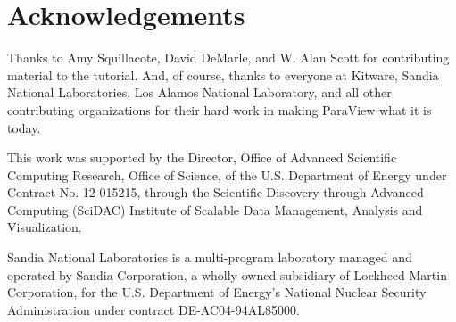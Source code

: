 \documentclass[@GLOBAL_OPTIONS@]{book}
\begin{document}

\tableofcontents

\listofexercise

\mainmatter











\backmatter

\chapter{Acknowledgements}

Thanks to Amy Squillacote, David DeMarle, and W. Alan Scott for
contributing material to the tutorial.  And, of course, thanks to everyone
at Kitware, Sandia National Laboratories, Los Alamos National Laboratory,
and all other contributing organizations for their hard work in making
ParaView what it is today.

This work was supported by the Director, Office of Advanced Scientific
Computing Research, Office of Science, of the U.S. Department of Energy
under Contract No. 12-015215, through the Scientific Discovery through
Advanced Computing (SciDAC) Institute of Scalable Data Management,
Analysis and Visualization.

Sandia National Laboratories is a multi-program laboratory managed and
operated by Sandia Corporation, a wholly owned subsidiary of Lockheed
Martin Corporation, for the U.S. Department of Energy's National Nuclear
Security Administration under contract DE-AC04-94AL85000.

\clearpage
{}
{}
\printindex
\end{document}
